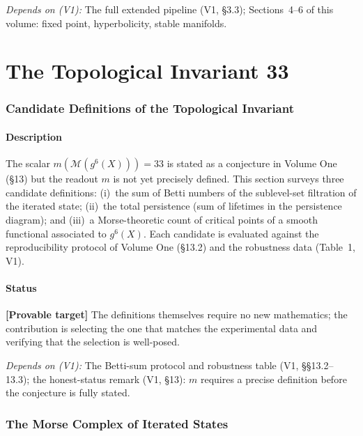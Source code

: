 \documentclass[11pt]{article}
\newcommand{\provable}{\textcolor{blue!70!black}{\textbf{[Provable target]}}}
\newcommand{\depends}[1]{\smallskip\noindent\textit{Depends on (V1):} #1.\smallskip}
\begin{document}
\depends{The full extended pipeline (V1, \S3.3);
Sections~4--6 of this volume: fixed point, hyperbolicity, stable manifolds}

\part{The Topological Invariant 33}

\section{Candidate Definitions of the Topological Invariant}

\subsection*{Description}
The scalar $m(\mathcal{M}(g^6(X))) = 33$ is stated as a conjecture in
Volume One (\S13) but the readout $m$ is not yet precisely defined.
This section surveys three candidate definitions: (i)~the sum of Betti
numbers of the sublevel-set filtration of the iterated state; (ii)~the
total persistence (sum of lifetimes in the persistence diagram); and
(iii)~a Morse-theoretic count of critical points of a smooth functional
associated to $g^6(X)$. Each candidate is evaluated against the
reproducibility protocol of Volume One (\S13.2) and the robustness data
(Table~1, V1).

\subsection*{Status}
\provable{} The definitions themselves require no new mathematics; the
contribution is selecting the one that matches the experimental data and
verifying that the selection is well-posed.

\depends{The Betti-sum protocol and robustness table (V1, \S\S13.2--13.3);
the honest-status remark (V1, \S13): $m$ requires a precise definition
before the conjecture is fully stated}

\section{The Morse Complex of Iterated States}
\end{document}
